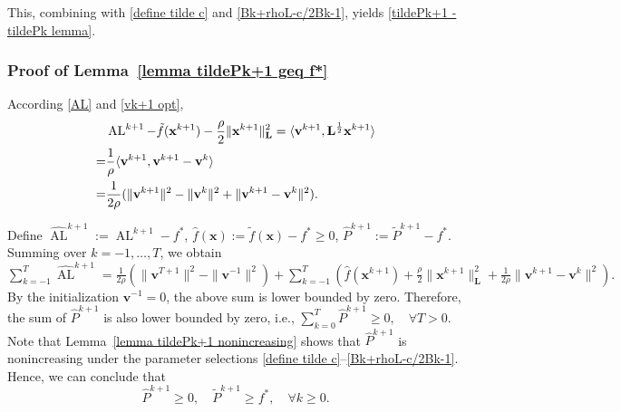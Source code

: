\documentclass[10pt,a4paper]{amsart}
\begin{document}
This, combining with \eqref{define tilde c} and \eqref{Bk+rhoL-c/2Bk-1}, yields \eqref{tildePk+1 - tildePk lemma}.

\subsubsection{Proof of Lemma~\ref{lemma tildePk+1 geq f*}}\label{proof lemma tildePk+1 geq f*}
According \eqref{AL} and \eqref{vk+1 opt}, 
\begin{align}
	&\operatorname{AL}^{k+1}-\tilde{f}(\mathbf{x}^{k+1})-\frac{\rho}{2}\|\mathbf{x}^{k+1}\|^2_\mathbf{L}= \langle \mathbf{v}^{k+1},\mathbf{L}^{\frac{1}{2}}\mathbf{x}^{k+1} \rangle\notag\\
	=& \frac{1}{\rho} \langle \mathbf{v}^{k+1},\mathbf{v}^{k+1}- \mathbf{v}^{k}\rangle  \notag\\
	=&\frac{1}{2\rho}(\|\mathbf{v}^{k+1}\|^2-\|\mathbf{v}^{k}\|^2+\|\mathbf{v}^{k+1}-\mathbf{v}^{k}\|^2 ). \label{ALk+1 - fxk+1}
\end{align}
 
Define $\widehat{\operatorname{AL}}^{k+1}:=\operatorname{AL}^{k+1}-f^*$, $\hat{f}(\mathbf{x}):=\tilde{f}(\mathbf{x})-f^*\geq 0$, $\hat{P}^{k+1}:= \tilde{P}^{k+1}-f^*$. Summing over $k=-1,\dots,T$, we obtain $\sum_{k=-1}^T \widehat{\operatorname{AL}}^{k+1} = \frac{1}{2\rho}(\|\mathbf{v}^{T+1}\|^2-\|\mathbf{v}^{-1}\|^2)
    + \sum_{k=-1}^T (\hat{f}(\mathbf{x}^{k+1})+\frac{\rho}{2}\|\mathbf{x}^{k+1}\|^2_\mathbf{L}+\frac{1}{2\rho}\|\mathbf{v}^{k+1}-\mathbf{v}^k\|^2).$
By the initialization $\mathbf{v}^{-1}=0$, the above sum is lower bounded by zero. Therefore, the sum of $\hat{P}^{k+1}$ is also lower bounded by zero, i.e., 
	$\sum_{k=0}^T \hat{P}^{k+1}\geq 0, \quad \forall T>0$. 
Note that Lemma~\ref{lemma tildePk+1 nonincreasing} shows that $\hat{P}^{k+1}$ is nonincreasing under the parameter selections \eqref{define tilde c}--\eqref{Bk+rhoL-c/2Bk-1}. Hence, we can conclude that
\begin{equation}
	\hat{P}^{k+1}\geq 0, \quad \tilde{P}^{k+1}\geq f^*, \quad \forall k \geq 0. \label{hat Pk+1 geq 0 tildePk+1 geq f*}
\end{equation}
\end{document}
